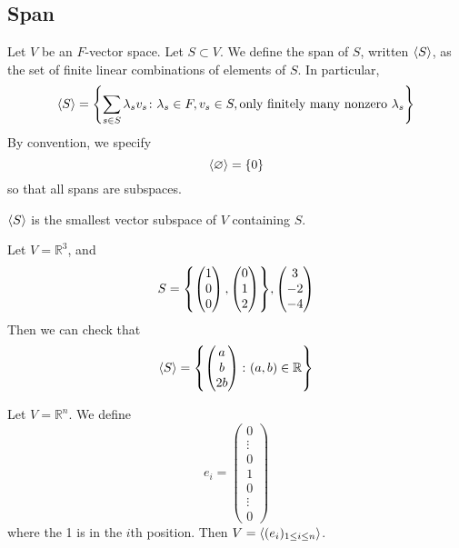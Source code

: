 \subsection{Span}
\begin{definition}
    Let \( V \) be an \( F \)-vector space.
    Let \( S \subset V \).
    We define the span of \( S \), written \( \langle{} S \rangle \), as the set of finite linear combinations of elements of \( S \).
    In particular,
    \[ \langle{} S \rangle = \qty{ \sum_{s \in S} \lambda_s v_s \colon \lambda_s \in F, v_s \in S, \text{only finitely many nonzero } \lambda_s } \]
    By convention, we specify
    \[ \langle{} \varnothing \rangle = \qty{0} \]
    so that all spans are subspaces.
\end{definition}
\begin{remark}
    \( \langle{} S \rangle \) is the smallest vector subspace of \( V \) containing \( S \).
\end{remark}
\begin{example}
    Let \( V = \mathbb R^3 \), and
    \[ S = \qty{ \begin{pmatrix}
        1 \\ 0 \\ 0
    \end{pmatrix}, \begin{pmatrix}
        0 \\ 1 \\ 2
    \end{pmatrix} }, \begin{pmatrix}
        3 \\ -2 \\ -4
    \end{pmatrix} \]
    Then we can check that
    \[ \langle{} S \rangle = \qty{\begin{pmatrix}
        a \\ b \\ 2b
    \end{pmatrix} \colon (a,b) \in \mathbb R} \]
\end{example}
\begin{example}
    Let \( V = \mathbb R^n \).
    We define
    \[ e_i = \begin{pmatrix}
        0 \\ \vdots \\ 0 \\ 1 \\ 0 \\ \vdots \\ 0
    \end{pmatrix} \]
    where the 1 is in the \( i \)th position.
    Then \( V = \langle{} (e_i)_{1 \leq i \leq n} \rangle \).
\end{example}
